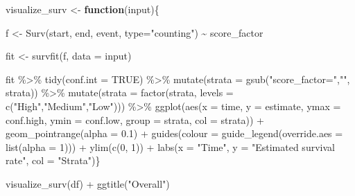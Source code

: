 \documentclass[
]{book}
\newenvironment{Shaded}{\begin{snugshade}}{\end{snugshade}}
\newcommand{\AttributeTok}[1]{\textcolor[rgb]{0.77,0.63,0.00}{#1}}
\newcommand{\ConstantTok}[1]{\textcolor[rgb]{0.00,0.00,0.00}{#1}}
\newcommand{\ControlFlowTok}[1]{\textcolor[rgb]{0.13,0.29,0.53}{\textbf{#1}}}
\newcommand{\DecValTok}[1]{\textcolor[rgb]{0.00,0.00,0.81}{#1}}
\newcommand{\FloatTok}[1]{\textcolor[rgb]{0.00,0.00,0.81}{#1}}
\newcommand{\FunctionTok}[1]{\textcolor[rgb]{0.00,0.00,0.00}{#1}}
\newcommand{\NormalTok}[1]{#1}
\newcommand{\OtherTok}[1]{\textcolor[rgb]{0.56,0.35,0.01}{#1}}
\newcommand{\SpecialCharTok}[1]{\textcolor[rgb]{0.00,0.00,0.00}{#1}}
\newcommand{\StringTok}[1]{\textcolor[rgb]{0.31,0.60,0.02}{#1}}
\begin{document}
\begin{Shaded}
\begin{Highlighting}[]
\NormalTok{visualize\_surv }\OtherTok{\textless{}{-}} \ControlFlowTok{function}\NormalTok{(input)\{}
  
\NormalTok{f }\OtherTok{\textless{}{-}} \FunctionTok{Surv}\NormalTok{(start, end, event, }\AttributeTok{type=}\StringTok{"counting"}\NormalTok{) }\SpecialCharTok{\textasciitilde{}}\NormalTok{ score\_factor}

\NormalTok{fit }\OtherTok{\textless{}{-}} \FunctionTok{survfit}\NormalTok{(f, }\AttributeTok{data =}\NormalTok{ input)}

\NormalTok{fit }\SpecialCharTok{\%\textgreater{}\%}
    \FunctionTok{tidy}\NormalTok{(}\AttributeTok{conf.int =} \ConstantTok{TRUE}\NormalTok{) }\SpecialCharTok{\%\textgreater{}\%}
    \FunctionTok{mutate}\NormalTok{(}\AttributeTok{strata =} \FunctionTok{gsub}\NormalTok{(}\StringTok{"score\_factor="}\NormalTok{,}\StringTok{""}\NormalTok{, strata)) }\SpecialCharTok{\%\textgreater{}\%}
    \FunctionTok{mutate}\NormalTok{(}\AttributeTok{strata =} \FunctionTok{factor}\NormalTok{(strata, }\AttributeTok{levels =} \FunctionTok{c}\NormalTok{(}\StringTok{"High"}\NormalTok{,}\StringTok{"Medium"}\NormalTok{,}\StringTok{"Low"}\NormalTok{))) }\SpecialCharTok{\%\textgreater{}\%}
    \FunctionTok{ggplot}\NormalTok{(}\FunctionTok{aes}\NormalTok{(}\AttributeTok{x =}\NormalTok{ time, }\AttributeTok{y =}\NormalTok{ estimate, }\AttributeTok{ymax =}\NormalTok{ conf.high, }\AttributeTok{ymin =}\NormalTok{ conf.low, }\AttributeTok{group =}\NormalTok{ strata, }\AttributeTok{col =}\NormalTok{ strata)) }\SpecialCharTok{+}
    \FunctionTok{geom\_pointrange}\NormalTok{(}\AttributeTok{alpha =} \FloatTok{0.1}\NormalTok{) }\SpecialCharTok{+}
    \FunctionTok{guides}\NormalTok{(}\AttributeTok{colour =} \FunctionTok{guide\_legend}\NormalTok{(}\AttributeTok{override.aes =} \FunctionTok{list}\NormalTok{(}\AttributeTok{alpha =} \DecValTok{1}\NormalTok{))) }\SpecialCharTok{+}
    \FunctionTok{ylim}\NormalTok{(}\FunctionTok{c}\NormalTok{(}\DecValTok{0}\NormalTok{, }\DecValTok{1}\NormalTok{)) }\SpecialCharTok{+}
    \FunctionTok{labs}\NormalTok{(}\AttributeTok{x =} \StringTok{"Time"}\NormalTok{, }\AttributeTok{y =} \StringTok{"Estimated survival rate"}\NormalTok{, }\AttributeTok{col =} \StringTok{"Strata"}\NormalTok{)\}}
\end{Highlighting}
\end{Shaded}

\begin{Shaded}
\begin{Highlighting}[]
\FunctionTok{visualize\_surv}\NormalTok{(df) }\SpecialCharTok{+} \FunctionTok{ggtitle}\NormalTok{(}\StringTok{"Overall"}\NormalTok{)}
\end{Highlighting}
\end{Shaded}
\end{document}
